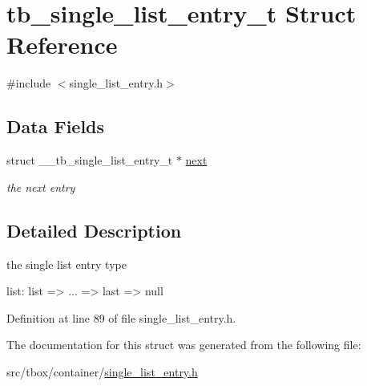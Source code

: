 \hypertarget{structtb__single__list__entry__t}{\section{tb\-\_\-single\-\_\-list\-\_\-entry\-\_\-t Struct Reference}
\label{structtb__single__list__entry__t}
}


{\ttfamily \#include $<$single\-\_\-list\-\_\-entry.\-h$>$}

\subsection*{Data Fields}
\begin{DoxyCompactItemize}
\item 
\hypertarget{structtb__single__list__entry__t_a57032cc2b9267a5a0f5f76573ac9764f}{struct \-\_\-\-\_\-tb\-\_\-single\-\_\-list\-\_\-entry\-\_\-t $\ast$ \hyperlink{structtb__single__list__entry__t_a57032cc2b9267a5a0f5f76573ac9764f}{next}}\label{structtb__single__list__entry__t_a57032cc2b9267a5a0f5f76573ac9764f}

\begin{DoxyCompactList}\small\item\em the next entry \end{DoxyCompactList}\end{DoxyCompactItemize}


\subsection{Detailed Description}
the single list entry type


\begin{DoxyPre}
list: list => ... => last => null\end{DoxyPre}



\begin{DoxyPre}\end{DoxyPre}
 

Definition at line 89 of file single\-\_\-list\-\_\-entry.\-h.



The documentation for this struct was generated from the following file\-:\begin{DoxyCompactItemize}
\item 
src/tbox/container/\hyperlink{single__list__entry_8h}{single\-\_\-list\-\_\-entry.\-h}\end{DoxyCompactItemize}
